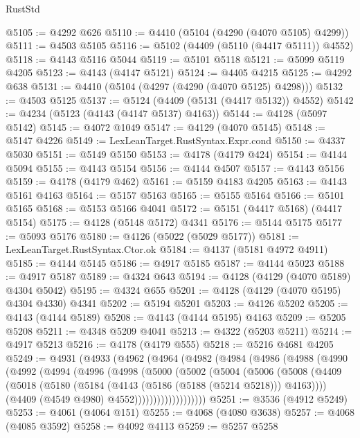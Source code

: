 \begin{lexlean}{RustStd}
\begin{coremodule}
@5105 := @4292 @626
@5110 := @4410 (@5104 (@4290 (@4070 @5105) @4299))
@5111 := @4503 @5105
@5116 := @5102 (@4409 (@5110 (@4417 @5111)) @4552)
@5118 := @4143 @5116 @5044
@5119 := @5101 @5118
@5121 := @5099 @5119 @4205
@5123 := @4143 (@4147 @5121)
@5124 := @4405 @4215
@5125 := @4292 @638
@5131 := @4410 (@5104 (@4297 (@4290 (@4070 @5125) @4298)))
@5132 := @4503 @5125
@5137 := @5124 (@4409 (@5131 (@4417 @5132)) @4552)
@5142 := @4234 (@5123 (@4143 (@4147 @5137) @4163))
@5144 := @4128 (@5097 @5142)
@5145 := @4072 @1049
@5147 := @4129 (@4070 @5145)
@5148 := @5147 @4226
@5149 := LexLeanTarget.RustSyntax.Expr.cond
@5150 := @4337 @5030
@5151 := @5149 @5150
@5153 := @4178 (@4179 @424)
@5154 := @4144 @5094
@5155 := @4143 @5154
@5156 := @4144 @4507
@5157 := @4143 @5156
@5159 := @4178 (@4179 @462)
@5161 := @5159 @4183 @4205
@5163 := @4143 @5161 @4163
@5164 := @5157 @5163
@5165 := @5155 @5164
@5166 := @5101 @5165
@5168 := @5153 @5166 @4041
@5172 := @5151 (@4417 @5168) (@4417 @5154)
@5175 := @4128 (@5148 @5172) @4341
@5176 := @5144 @5175
@5177 := @5093 @5176
@5180 := @4126 (@5022 (@5029 @5177))
@5181 := LexLeanTarget.RustSyntax.Ctor.ok
@5184 := @4137 (@5181 @4972 @4911)
@5185 := @4144 @5145
@5186 := @4917 @5185
@5187 := @4144 @5023
@5188 := @4917 @5187
@5189 := @4324 @643
@5194 := @4128 (@4129 (@4070 @5189) @4304 @5042)
@5195 := @4324 @655
@5201 := @4128 (@4129 (@4070 @5195) @4304 @4330) @4341
@5202 := @5194 @5201
@5203 := @4126 @5202
@5205 := @4143 (@4144 @5189)
@5208 := @4143 (@4144 @5195) @4163
@5209 := @5205 @5208
@5211 := @4348 @5209 @4041
@5213 := @4322 (@5203 @5211)
@5214 := @4917 @5213
@5216 := @4178 (@4179 @555)
@5218 := @5216 @4681 @4205
@5249 := @4931
    (@4933
      (@4962
        (@4964
          (@4982
            (@4984
              (@4986
                (@4988
                  (@4990
                    (@4992
                      (@4994
                        (@4996
                          (@4998
                            (@5000
                              (@5002
                                (@5004
                                  (@5006
                                    (@5008
                                      (@4409
                                        (@5018
                                          (@5180
                                            (@5184 (@4143 (@5186 (@5188 (@5214 @5218))) @4163))))
                                        (@4409 (@4549 @4980) @4552)))))))))))))))))))
@5251 := @3536 (@4912 @5249)
@5253 := @4061 (@4064 @151)
@5255 := @4068 (@4080 @3638)
@5257 := @4068 (@4085 @3592)
@5258 := @4092 @4113
@5259 := @5257 @5258

\end{coremodule}
\end{lexlean}
